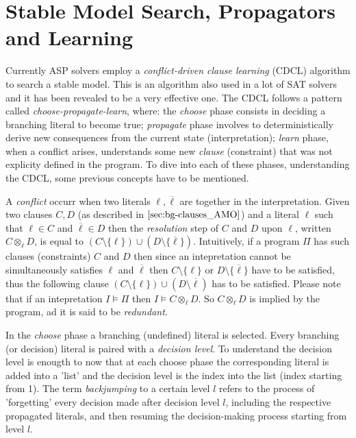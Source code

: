 \section{Stable Model Search, Propagators and Learning}
\label{sec:bg-SM}

Currently ASP solvers employ a \textit{conflict-driven clause learning} (CDCL) algorithm
\cite{DBLP:journals/ai/GebserKS12} to search a stable model.
This is an algorithm also used in a lot of SAT solvers and it has been revealed to be a 
very effective one.
The CDCL follows a pattern called \textit{choose-propagate-learn}, where: 
the \textit{choose} phase consists in deciding a branching literal to become true;
\textit{propagate} phase involves to deterministically derive new consequences from the current
state (interpretation); \textit{learn} phase, when a conflict arises, understands
some new \textit{clause} (constraint) that was not explicity defined in the program.
To dive into each of these phases, understanding the CDCL, some previous concepts have
to be mentioned.

A \textit{conflict} occurr when two literals $\ell, \overline{\ell}$ are together in the interpretation.
Given two clauses $C,D$ (as described in $\ref{sec:bg-clauses_AMO}$) and a literal 
$\ell$ such that $\ell \in C$ and $\overline{\ell} \in D$ then the \textit{resolution}
step of $C$ and $D$ upon $\ell$, written $C \otimes_{\ell} D$, is equal to 
$(C \setminus \{\ell\}) \cup (D \setminus \{\overline{\ell}\})$.
Intuitively, if a program $\Pi$ has such clauses (constraints) $C$ and $D$
then since an intepretation cannot be simultaneously
satisfies $\ell$ and $\overline{\ell}$ then $C \setminus \{\ell\}$ or 
$D \setminus \{ \overline{\ell}\}$ have to be satisfied, thus the following clause 
$(C \setminus \{\ell\}) \cup (D \setminus \overline{\ell})$ has to be satisfied.
Please note that if an intepretation $I \models \Pi$ then $I \models C \otimes_{\ell} D$.
So $C \otimes_{\ell} D$ is implied by the program, ad it is said to be \textit{redundant}.


In the \textit{choose} phase a branching (undefined) literal is selected.
Every branching (or decision) literal is paired with a \textit{decision level}.
To understand the decision level is enougth to 
now that at each choose phase the corresponding literal is added into a 'list' and
the decision level is the index into the list (index starting from 1). 
The term \textit{backjumping} to a certain level $l$ refers to the process of 'forgetting' 
every decision made after decision level $l$, 
including the respective propagated literals, and then 
resuming the decision-making process starting from level $l$.


